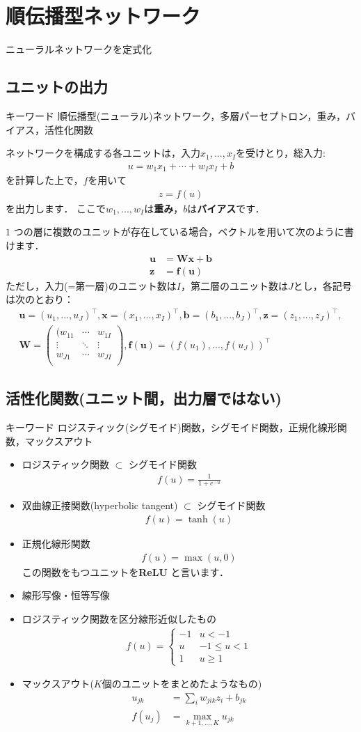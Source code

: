 \documentclass[a4paper,10pt]{jsarticle}
\theoremstyle{definition}
\newcommand{\eq}[1]{\begin{align}#1\end{align}}
\newcommand{\items}[1]{\begin{itemize}#1\end{itemize}}
\begin{document}
\setcounter{section}{1}
\section{順伝播型ネットワーク}
ニューラルネットワークを定式化
%
\subsection{ユニットの出力}
\begin{itembox}[l]{キーワード}
順伝播型(ニューラル)ネットワーク，多層パーセプトロン，重み，バイアス，活性化関数
\end{itembox}
ネットワークを構成する各ユニットは，入力$x_1,...,x_I$を受けとり，総入力:
\eq{u=w_1x_1+\cdots+w_Ix_I+b}
を計算した上で，$f$を用いて
\eq{z=f(u)}
を出力します．
ここで$w_1,...,w_I$は\textbf{重み}，$b$は\textbf{バイアス}です．

$1$ つの層に複数のユニットが存在している場合，ベクトルを用いて次のように書けます．
\eq{\mathbf{u}&=\mathbf{Wx}+\mathbf{b}\\
\mathbf{z}&=\mathbf{f}(\mathbf{u})}
ただし，入力(=第一層)のユニット数は$I$，第二層のユニット数は$J$とし，各記号は次のとおり：
\eq{\mathbf{u}=(u_1,...,u_J)^\top,\mathbf{x}=(x_1,...,x_I)^\top,\mathbf{b}=(b_1,...,b_J)^\top,\mathbf{z}=(z_1,...,z_J)^\top,\\
\mathbf{W}=\begin{pmatrix}(w_{11}&\cdots&w_{1I}\\\vdots&\ddots&\vdots\\w_{J1}&\cdots&w_{JI}\\\end{pmatrix},\mathbf{f}(\mathbf{u})=(f(u_1),...,f(u_J))^\top}

%
\subsection{活性化関数(ユニット間，出力層ではない)}
\begin{itembox}[l]{キーワード}
ロジスティック(シグモイド)関数，シグモイド関数，正規化線形関数，マックスアウト
\end{itembox}
\items{
	\item ロジスティック関数 $\subset$ シグモイド関数　
		\eq{f(u)=\frac{1}{1+e^{-u}}}
	\item 双曲線正接関数(hyperbolic tangent) $\subset$ シグモイド関数　
		\eq{f(u)=\tanh(u)}
	\item 正規化線形関数
		\eq{f(u)=\max(u,0)}
		この関数をもつユニットを\textbf{ReLU} と言います．
	\item 線形写像・恒等写像
	\item ロジスティック関数を区分線形近似したもの
		\eq{f(u)=\begin{cases}-1&u<-1\\u&-1\le u<1\\1&u\ge1\end{cases}}
	\item マックスアウト($K$個のユニットをまとめたようなもの)
		\eq{
			u_{jk}&=\sum_iw_{jik}z_i+b_{jk}\\
			f(u_j)&=\max_{k+1,...,K}u_{jk}}
	}
%
\end{document}
